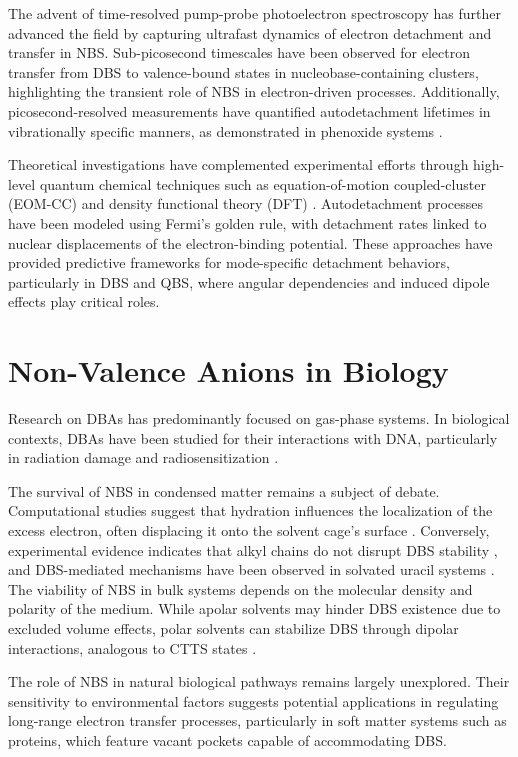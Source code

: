 The advent of time-resolved pump-probe photoelectron spectroscopy has further advanced the field by capturing ultrafast dynamics of electron detachment and transfer in NBS. Sub-picosecond timescales have been observed for electron transfer from DBS to valence-bound states in nucleobase-containing clusters, highlighting the transient role of NBS in electron-driven processes. Additionally, picosecond-resolved measurements have quantified autodetachment lifetimes in vibrationally specific manners, as demonstrated in phenoxide systems \cite{jordan2003theory,paran2024performance}.

Theoretical investigations have complemented experimental efforts through high-level quantum chemical techniques such as equation-of-motion coupled-cluster (EOM-CC) and density functional theory (DFT) \cite{thiam2023accurately}. Autodetachment processes have been modeled using Fermi's golden rule, with detachment rates linked to nuclear displacements of the electron-binding potential. These approaches have provided predictive frameworks for mode-specific detachment behaviors, particularly in DBS and QBS, where angular dependencies and induced dipole effects play critical roles.

\section{Non-Valence Anions in Biology}
Research on DBAs has predominantly focused on gas-phase systems. In biological contexts, DBAs have been studied for their interactions with DNA, particularly in radiation damage and radiosensitization \cite{narayanan2023secondary,sedmidubska2024interaction}. 

The survival of NBS in condensed matter remains a subject of debate. Computational studies suggest that hydration influences the localization of the excess electron, often displacing it onto the solvent cage's surface \cite{anusiewicz2020fate}. Conversely, experimental evidence indicates that alkyl chains do not disrupt DBS stability \cite{castellani2019stability}, and DBS-mediated mechanisms have been observed in solvated uracil systems \cite{narayanan2024electron}. The viability of NBS in bulk systems depends on the molecular density and polarity of the medium. While apolar solvents may hinder DBS existence due to excluded volume effects, polar solvents can stabilize DBS through dipolar interactions, analogous to CTTS states \cite{bradforth2002excited,chen2000precursors}.

The role of NBS in natural biological pathways remains largely unexplored. Their sensitivity to environmental factors suggests potential applications in regulating long-range electron transfer processes, particularly in soft matter systems such as proteins, which feature vacant pockets capable of accommodating DBS.

